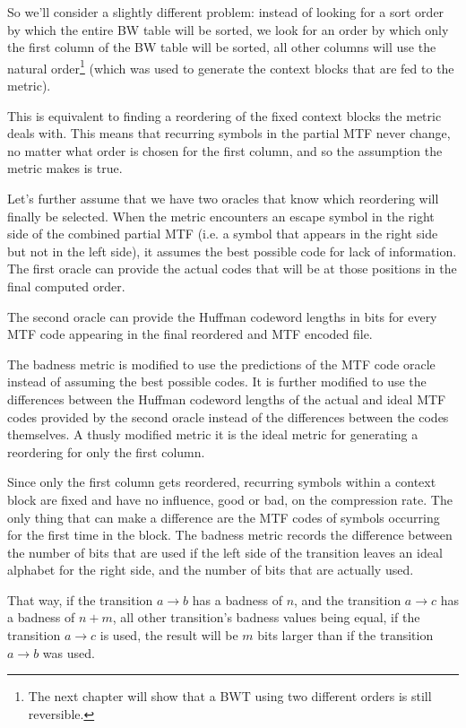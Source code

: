 \documentclass[a4paper]{scrreprt}
\begin{document}
So we'll consider a slightly different problem: instead of looking for a sort
order by which the entire BW table will be sorted, we look for an order by which
only the first column of the BW table will be sorted, all other columns will use
the natural order\footnote{The next chapter will show that a BWT using two
different orders is still reversible.} (which was used to generate the
context blocks that are fed to the metric).

This is equivalent to finding a reordering of the fixed context blocks the
metric deals with. This means that recurring symbols in the partial MTF never
change, no matter what order is chosen for the first column, and so the
assumption the metric makes is true.

Let's further assume that we have two oracles that know which reordering will
finally be selected. When the metric encounters an escape symbol in the right
side of the combined partial MTF (i.e. a symbol that appears in the right side
but not in the left side), it assumes the best possible code for lack of
information. The first oracle can provide the actual codes that will be at those
positions in the final computed order.

The second oracle can provide the Huffman codeword lengths in bits for every MTF
code appearing in the final reordered and MTF encoded file.

The badness metric is modified to use the predictions of the MTF code oracle
instead of assuming the best possible codes. It is further modified to use the
differences between the Huffman codeword lengths of the actual and ideal MTF
codes provided by the second oracle instead of the differences between the
codes themselves. A thusly modified metric it is the ideal metric for generating
a reordering for only the first column.

Since only the first column gets reordered, recurring symbols within a context
block are fixed and have no influence, good or bad, on the compression rate. The
only thing that can make a difference are the MTF codes of symbols occurring for
the first time in the block. The badness metric records the difference between
the number of bits that are used if the left side of the transition leaves an
ideal alphabet for the right side, and the number of bits that are actually used.

That way, if the transition \(a \rightarrow b\) has a badness of \(n\), and the
transition \(a \rightarrow c\) has a badness of \(n + m\), all other
transition's badness values being equal, if the transition \(a \rightarrow c\)
is used, the result will be \(m\) bits larger than if the transition \(a
\rightarrow b\) was used.
\end{document}
